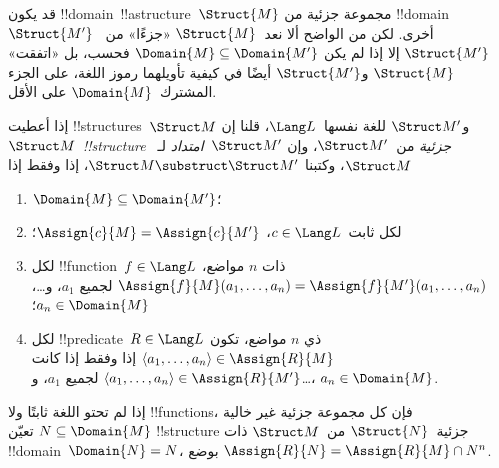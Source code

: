 \documentclass[../../../include/open-logic-section]{subfiles}
\begin{document}

قد يكون !!{domain}~!!a{structure}~$\Struct{M}$ مجموعة جزئية من
!!{domain}~$\Struct{M'}$ أخرى. لكن من الواضح ألا نعد~$\Struct{M}$
«جزءًا» من~$\Struct{M'}$ إلا إذا لم يكن $\Domain{M} \subseteq
\Domain{M'}$ فحسب، بل «اتفقت» $\Struct{M}$ و$\Struct{M'}$ أيضًا في
كيفية تأويلهما رموز اللغة، على الجزء المشترك~$\Domain{M}$ على الأقل.

\begin{defn}
إذا أعطيت !!{structure}s~$\Struct M$ و$\Struct M'$ للغة نفسها~$\Lang
L$، قلنا إن $\Struct M$~\emph{!!{structure} جزئية} من~$\Struct M'$،
وإن $\Struct M'$~\emph{امتداد} لـ~$\Struct M$، وكتبنا $\Struct M
\substruct \Struct M'$، إذا وفقط إذا
\begin{enumerate}
\item $\Domain{M} \subseteq \Domain{M'}$؛
\item لكل ثابت~$c \in \Lang L$، $\Assign{c}{M} =
    \Assign{c}{M'}$؛
\item لكل !!{function}~$f \in \Lang L$ ذات $n$ مواضع،
  $\Assign{f}{M}(a_1, \dots, a_n) = \Assign{f}{M'}(a_1, \dots, a_n)$
  لجميع $a_1$، و\dots، $a_n \in \Domain{M}$؛
\item لكل !!{predicate}~$R \in \Lang L$ ذي $n$ مواضع، تكون $\langle
  a_1, \dots, a_n\rangle \in \Assign{R}{M}$ إذا وفقط إذا كانت
  $\langle a_1, \dots, a_n\rangle \in \Assign{R}{M'}$ لجميع $a_1$،
  و\dots، $a_n \in \Domain{M}$.
\end{enumerate}
\end{defn}

\begin{rem}
إذا لم تحتو اللغة ثابتًا ولا !!{function}s، فإن كل مجموعة جزئية غير
خالية $N \subseteq \Domain{M}$ تعيّن !!{structure} جزئية~$\Struct{N}$
من~$\Struct M$ ذات !!{domain}~$\Domain{N} = N$، بوضع
$\Assign{R}{N} = \Assign{R}{M} \cap N^n$.
\end{rem}

\end{document}

